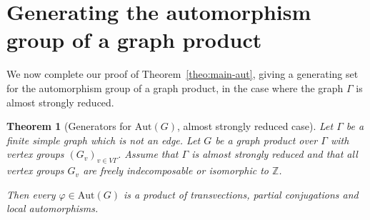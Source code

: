 \documentclass[a4paper,english,11pt]{article}
\newtheorem{theo}[de]{Theorem}
\theoremstyle{definition}
\theoremstyle{remark}
\newcommand{\Aut}{\mathrm{Aut}}
\newcommand{\bZ}{\mathbb{Z}}
\begin{document}
\section{Generating the automorphism group of a graph product}\label{sec:endgame-automorphisms}

We now complete our proof of Theorem~\ref{theo:main-aut}, giving a generating set for the automorphism group of a graph product, in the case where the graph $\Gamma$ is almost strongly reduced.

\begin{theo}[Generators for $\Aut(G)$, almost strongly reduced case]\label{theo:conclusion}
Let $\Gamma$ be a finite simple graph which is not an edge. Let $G$ be a graph product over $\Gamma$ with vertex groups $(G_v)_{v\in V\Gamma}$. Assume that $\Gamma$ is almost strongly reduced and that all vertex groups $G_v$ are freely indecomposable or isomorphic to $\bZ$. 

Then every $\varphi\in\Aut(G)$ is a product of transvections, partial conjugations and local automorphisms.
\end{theo}
\end{document}
